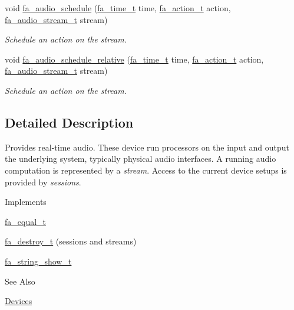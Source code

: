 \begin{DoxyCompactItemize}
void \hyperlink{group___fa_audio_stream_gad98527accbfa2dcd59124577eac422bc}{fa\-\_\-audio\-\_\-schedule} (\hyperlink{group___fa_time_ga227cc693f20b4873fed11028bcade184}{fa\-\_\-time\-\_\-t} time, \hyperlink{group___fa_action_gadb08ae063168671e5fedc6c23f20ae4b}{fa\-\_\-action\-\_\-t} action, \hyperlink{group___fa_audio_stream_ga78fbee3026130ce00d8e00a4e73a84c3}{fa\-\_\-audio\-\_\-stream\-\_\-t} stream)
\begin{DoxyCompactList}\small\item\em Schedule an action on the stream. \end{DoxyCompactList}\item 
void \hyperlink{group___fa_audio_stream_ga4283ce1b2c9605c1b5086e2439ae6ce4}{fa\-\_\-audio\-\_\-schedule\-\_\-relative} (\hyperlink{group___fa_time_ga227cc693f20b4873fed11028bcade184}{fa\-\_\-time\-\_\-t} time, \hyperlink{group___fa_action_gadb08ae063168671e5fedc6c23f20ae4b}{fa\-\_\-action\-\_\-t} action, \hyperlink{group___fa_audio_stream_ga78fbee3026130ce00d8e00a4e73a84c3}{fa\-\_\-audio\-\_\-stream\-\_\-t} stream)
\begin{DoxyCompactList}\small\item\em Schedule an action on the stream. \end{DoxyCompactList}\end{DoxyCompactItemize}


\subsection{Detailed Description}
Provides real-\/time audio. These device run processors on the input and output the underlying system, typically physical audio interfaces. A running audio computation is represented by a {\itshape stream}. Access to the current device setups is provided by {\itshape sessions}.

\begin{DoxyParagraph}{Implements}

\begin{DoxyItemize}
\item \hyperlink{structfa__equal__t}{fa\-\_\-equal\-\_\-t}
\item \hyperlink{structfa__destroy__t}{fa\-\_\-destroy\-\_\-t} (sessions and streams)
\item \hyperlink{structfa__string__show__t}{fa\-\_\-string\-\_\-show\-\_\-t}
\end{DoxyItemize}
\end{DoxyParagraph}
\begin{DoxySeeAlso}{See Also}

\begin{DoxyItemize}
\item \hyperlink{md__devices_Devices}{Devices} 
\end{DoxyItemize}
\end{DoxySeeAlso}


